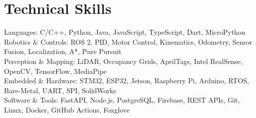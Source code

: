 \documentclass[11pt]{article}       %
\newcommand{\textsb}[1]{{\fontseries{sb}\selectfont #1}}
\begin{document}
\section*{Technical Skills}
\textsb{Languages:} C/C++, Python, Java, JavaScript, TypeScript, Dart, MicroPython \\[-1pt]
\textsb{Robotics \& Controls:} ROS 2, PID, Motor Control, Kinematics, Odometry, Sensor Fusion, Localization, A*, Pure Pursuit \\[-1pt]
\textsb{Perception \& Mapping:} LiDAR, Occupancy Grids, AprilTags, Intel RealSense, OpenCV, TensorFlow, MediaPipe \\[-1pt]
\textsb{Embedded \& Hardware:} STM32, ESP32, Jetson, Raspberry Pi, Arduino, RTOS, Bare-Metal, UART, SPI, SolidWorks \\[-1pt]
\textsb{Software \& Tools:} FastAPI, Node.js, PostgreSQL, Firebase, REST APIs, Git, Linux, Docker, GitHub Actions, Foxglove
\end{document}
